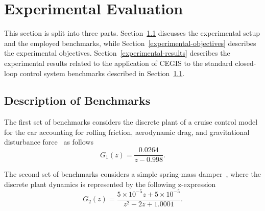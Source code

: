 \documentclass{sig-alternate-05-2015}
\begin{document}
\section{Experimental Evaluation} \label{sec:experiments}

This section is split into three parts. Section~\ref{experimental-setup}
discusses the experimental setup and the employed benchmarks, while
Section~\ref{experimental-objectives} describes the experimental objectives. 
Section~\ref{experimental-results} describes the experimental results
related to the application of CEGIS to the standard closed-loop control
system benchmarks described in Section~\ref{experimental-setup}.

\subsection{Description of Benchmarks}
\label{experimental-setup}

The first set of benchmarks considers the discrete plant of a cruise 
control model for the car accounting for rolling friction, aerodynamic drag, 
and gravitational disturbance force~\cite{Astrom08} as follows
%
\begin{equation}
\label{cruise-control-c1}
G_1(z)=\frac{0.0264}{z-0.998}. \nonumber
\end{equation} 

%
%

The second set of benchmarks considers a simple spring-mass 
damper~\cite{DBLP:conf/hybrid/WangGRJF16}, where the discrete 
plant dynamics is represented by the following z-expression
%
%
\begin{equation}
\label{spring-mass-damper-g}
G_2(z)=\frac{5\times{10^{-5}}z + 5\times{10^{-5}}}{z^2 - 2z + 1.0001}. \nonumber
\end{equation} 
%
\end{document}
